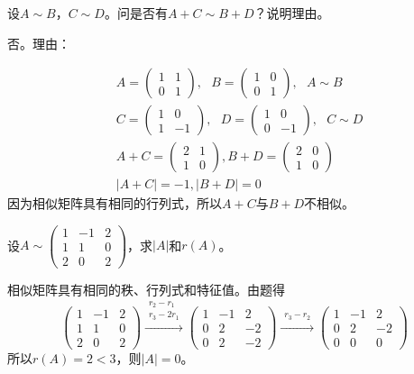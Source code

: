 \documentclass[a4paper]{report}
\begin{document}
\EX 设$A\sim B$，$C\sim D$。问是否有$A+C\sim B+D$？说明理由。

\begin{jie}
否。理由：

\begin{align*}
&A=
\begin{pmatrix}
1&1\\ 0&1
\end{pmatrix},~~~B=
\begin{pmatrix}
1&0\\ 0&1
\end{pmatrix},~~~A\sim B\\
&C=
\begin{pmatrix}
1&0\\ 1&-1
\end{pmatrix},~~~D=
\begin{pmatrix}
1&0\\ 0&-1
\end{pmatrix},~~~C\sim D\\
& A+C=
\begin{pmatrix}
2&1\\ 1&0
\end{pmatrix},B+D=
\begin{pmatrix}
2&0\\
1&0
\end{pmatrix}\\
&|A+C|=-1,|B+D|=0
\end{align*}
因为相似矩阵具有相同的行列式，所以$A+C$与$B+D$不相似。
\end{jie}

\EX 设$A\sim
\begin{pmatrix}
1&-1&2\\
1&1&0\\
2&0&2
\end{pmatrix}
$，求$|A|$和$r(A)$。

\begin{jie}
相似矩阵具有相同的秩、行列式和特征值。由题得
\begin{equation*}
\begin{pmatrix}
1&-1&2\\
1&1&0\\
2&0&2
\end{pmatrix}\xrightarrow{\substack{r_{2}-r_{1}\\ r_3-2r_1}}
{
\begin{pmatrix}
1&-1&2\\
0&2&-2\\
0&2&-2
\end{pmatrix}
}\xrightarrow{\substack{ r_3-r_2}}
{
\begin{pmatrix}
1&-1&2\\
0&2&-2\\
0&0&0
\end{pmatrix}
}
\end{equation*}
所以$r(A)=2<3$，则$|A|=0$。
\end{jie}
\end{document}
